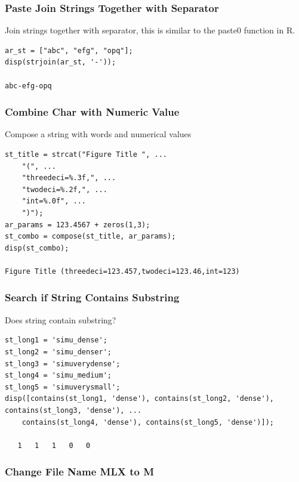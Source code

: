 \documentclass[
]{book}
\begin{document}
\hypertarget{paste-join-strings-together-with-separator}{%
\subsubsection{Paste Join Strings Together with Separator}\label{paste-join-strings-together-with-separator}}

Join strings together with separator, this is similar to the paste0
function in R.

\begin{verbatim}
ar_st = ["abc", "efg", "opq"];
disp(strjoin(ar_st, '-'));

abc-efg-opq
\end{verbatim}

\hypertarget{combine-char-with-numeric-value}{%
\subsubsection{Combine Char with Numeric Value}\label{combine-char-with-numeric-value}}

Compose a string with words and numerical values

\begin{verbatim}
st_title = strcat("Figure Title ", ...
    "(", ...
    "threedeci=%.3f,", ...
    "twodeci=%.2f,", ...
    "int=%.0f", ...
    ")");
ar_params = 123.4567 + zeros(1,3);
st_combo = compose(st_title, ar_params);
disp(st_combo);

Figure Title (threedeci=123.457,twodeci=123.46,int=123)
\end{verbatim}

\hypertarget{search-if-string-contains-substring}{%
\subsubsection{Search if String Contains Substring}\label{search-if-string-contains-substring}}

Does string contain substring?

\begin{verbatim}
st_long1 = 'simu_dense';
st_long2 = 'simu_denser';
st_long3 = 'simuverydense';
st_long4 = 'simu_medium';
st_long5 = 'simuverysmall';
disp([contains(st_long1, 'dense'), contains(st_long2, 'dense'), contains(st_long3, 'dense'), ...
    contains(st_long4, 'dense'), contains(st_long5, 'dense')]);

   1   1   1   0   0
\end{verbatim}

\hypertarget{change-file-name-mlx-to-m}{%
\subsubsection{Change File Name MLX to M}\label{change-file-name-mlx-to-m}}
\end{document}
